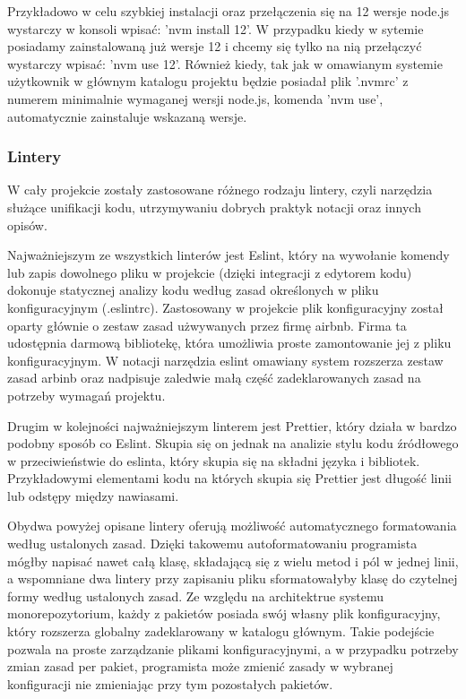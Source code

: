 Przykładowo w celu szybkiej instalacji oraz przełączenia się na 12 wersje node.js wystarczy w konsoli wpisać: 'nvm install 12'. W przypadku kiedy w sytemie posiadamy zainstalowaną już wersje 12 i chcemy się tylko na nią przełączyć wystarczy wpisać: 'nvm use 12'. Również kiedy, tak jak w omawianym systemie użytkownik w głównym katalogu projektu będzie posiadał plik '.nvmrc' z numerem minimalnie wymaganej wersji node.js, komenda 'nvm use', automatycznie zainstaluje wskazaną wersje.


\subsubsection{Lintery}
W cały projekcie zostały zastosowane różnego rodzaju lintery, czyli narzędzia służące unifikacji kodu, utrzymywaniu dobrych praktyk notacji oraz innych opisów.

Najważniejszym ze wszystkich linterów jest Eslint, który na wywołanie komendy lub zapis dowolnego pliku w projekcie (dzięki integracji z edytorem kodu) dokonuje statycznej analizy kodu według zasad określonych w pliku konfiguracyjnym (.eslintrc). Zastosowany w projekcie plik konfiguracyjny został oparty głównie o zestaw zasad użwywanych przez firmę airbnb. Firma ta udostępnia darmową bibliotekę, która umożliwia proste zamontowanie jej z pliku konfiguracyjnym. W notacji narzędzia eslint omawiany system rozszerza zestaw zasad arbinb oraz nadpisuje zaledwie małą część zadeklarowanych zasad na potrzeby wymagań projektu.

Drugim w kolejności najważniejszym linterem jest Prettier, który działa w bardzo podobny sposób co Eslint. Skupia się on jednak na analizie stylu kodu źródłowego w przeciwieństwie do eslinta, który skupia się na składni języka i bibliotek. Przykładowymi elementami kodu na których skupia się Prettier jest długość linii lub odstępy między nawiasami.

Obydwa powyżej opisane lintery oferują możliwość automatycznego formatowania według ustalonych zasad. Dzięki takowemu autoformatowaniu programista mógłby napisać nawet całą klasę, składającą się z wielu metod i pól w jednej linii, a wspomniane dwa lintery przy zapisaniu pliku sformatowałyby klasę do czytelnej formy według ustalonych zasad. Ze względu na architektrue systemu monorepozytorium, każdy z pakietów posiada swój własny plik konfiguracyjny, który rozszerza globalny zadeklarowany w katalogu głównym. Takie podejście pozwala na proste zarządzanie plikami konfiguracyjnymi, a w przypadku potrzeby zmian zasad per pakiet, programista może zmienić zasady w wybranej konfiguracji nie zmieniając przy tym pozostałych pakietów.

